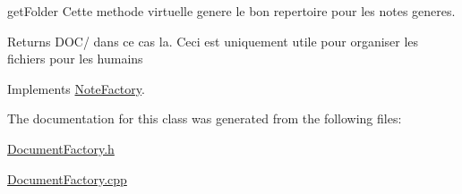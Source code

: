 get\-Folder Cette methode virtuelle genere le bon repertoire pour les notes generes. 

\begin{DoxyReturn}{Returns}
D\-O\-C/ dans ce cas la. Ceci est uniquement utile pour organiser les fichiers pour les humains 
\end{DoxyReturn}


Implements \hyperlink{class_note_factory_a9d4c924038af855a7c4a51455b13ab83}{Note\-Factory}.



The documentation for this class was generated from the following files\-:\begin{DoxyCompactItemize}
\item 
\hyperlink{_document_factory_8h}{Document\-Factory.\-h}\item 
\hyperlink{_document_factory_8cpp}{Document\-Factory.\-cpp}\end{DoxyCompactItemize}
